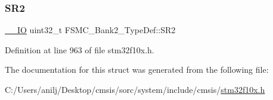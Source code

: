 \subsubsection{\texorpdfstring{S\+R2}{SR2}}
{\footnotesize\ttfamily \hyperlink{core__sc300_8h_aec43007d9998a0a0e01faede4133d6be}{\+\_\+\+\_\+\+IO} uint32\+\_\+t F\+S\+M\+C\+\_\+\+Bank2\+\_\+\+Type\+Def\+::\+S\+R2}



Definition at line 963 of file stm32f10x.\+h.



The documentation for this struct was generated from the following file\+:\begin{DoxyCompactItemize}
\item 
C\+:/\+Users/anilj/\+Desktop/cmsis/sorc/system/include/cmsis/\hyperlink{stm32f10x_8h}{stm32f10x.\+h}\end{DoxyCompactItemize}
